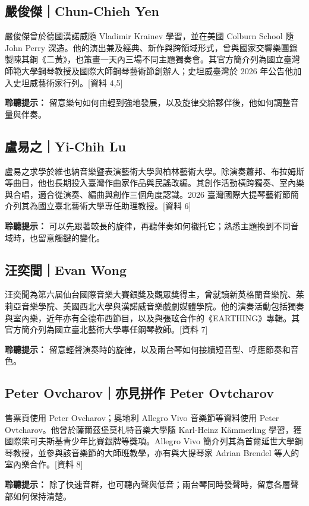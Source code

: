 \documentclass[UTF8,12pt,a4paper,fontset=none]{ctexart}
\newcommand{\src}[1]{{\small\color{accent}[資料 #1]}}
\begin{document}
\subsection{嚴俊傑｜Chun-Chieh Yen}
嚴俊傑曾於德國漢諾威隨 Vladimir Krainev 學習，並在美國 Colburn School 隨 John Perry 深造。他的演出兼及經典、新作與跨領域形式，曾與國家交響樂團錄製陳其鋼《二黃》，也策畫一天內三場不同主題獨奏會。其官方簡介列為國立臺灣師範大學鋼琴教授及國際大師鋼琴藝術節創辦人；史坦威臺灣於 2026 年公告他加入史坦威藝術家行列。\src{4,5}

\textbf{聆聽提示：} 留意樂句如何由輕到強地發展，以及旋律交給夥伴後，他如何調整音量與伴奏。

\subsection{盧易之｜Yi-Chih Lu}
盧易之求學於維也納音樂暨表演藝術大學與柏林藝術大學。除演奏蕭邦、布拉姆斯等曲目，他也長期投入臺灣作曲家作品與民謠改編。其創作活動橫跨獨奏、室內樂與合唱，適合從演奏、編曲與創作三個角度認識。2026 臺灣國際大提琴藝術節簡介列其為國立臺北藝術大學專任助理教授。\src{6}

\textbf{聆聽提示：} 可以先跟著較長的旋律，再聽伴奏如何襯托它；熟悉主題換到不同音域時，也留意觸鍵的變化。

\subsection{汪奕聞｜Evan Wong}
汪奕聞為第六屆仙台國際音樂大賽銀獎及觀眾獎得主，曾就讀新英格蘭音樂院、茱莉亞音樂學院、美國西北大學與漢諾威音樂戲劇媒體學院。他的演奏活動包括獨奏與室內樂，近年亦有全德布西節目，以及與張玹合作的《EARTHING》專輯。其官方簡介列為國立臺北藝術大學專任鋼琴教師。\src{7}

\textbf{聆聽提示：} 留意輕聲演奏時的旋律，以及兩台琴如何接續短音型、呼應節奏和音色。

\subsection{Peter Ovcharov｜亦見拼作 Peter Ovtcharov}
售票頁使用 Peter Ovcharov；奧地利 Allegro Vivo 音樂節等資料使用 Peter Ovtcharov。他曾於薩爾茲堡莫札特音樂大學隨 Karl-Heinz Kämmerling 學習，獲國際柴可夫斯基青少年比賽銀牌等獎項。Allegro Vivo 簡介列其為首爾延世大學鋼琴教授，並參與該音樂節的大師班教學，亦有與大提琴家 Adrian Brendel 等人的室內樂合作。\src{8}

\textbf{聆聽提示：} 除了快速音群，也可聽內聲與低音；兩台琴同時發聲時，留意各層聲部如何保持清楚。
\end{document}
